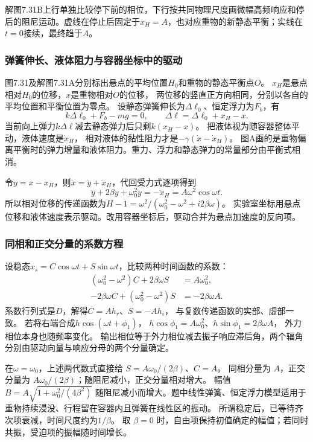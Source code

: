 \documentclass[UTF8,fontset=fandol,a4paper,11pt]{ctexart}
\begin{document}
解图7.31B上行单独比较停下前的相位，下行按共同物理尺度画微幅高频响应和停后的阻尼运动。虚线在停止后固定于$x_H=A$，也对应重物的新静态平衡；实线在$t=0$接续，最终趋于$A$。
\subsubsection*{弹簧伸长、液体阻力与容器坐标中的驱动}
图7.31及解图7.31A分别标出悬点的平均位置$H_0$和重物的静态平衡点$O$。
$x_H$是悬点相对$H_0$的位移，$x$是重物相对$O$的位移，
两位移的竖直正方向相同，分别以各自的平均位置和平衡位置为零点。
设静态弹簧伸长为$\Delta\ell_0$、恒定浮力为$F_b$，有
\[
k\Delta\ell_0+F_b-mg=0,\qquad
\Delta\ell=\Delta\ell_0+x_H-x.
\]
当前向上弹力$k\Delta\ell$减去静态弹力后只剩$k(x_H-x)$。
把液体视为随容器整体平动，液体速度是$\dot x_H$，
相对液体的黏性阻力才是$-\gamma(\dot x-\dot x_H)$。
图A画的是重物偏离平衡时的弹力增量和液体阻力。重力、浮力和静态弹力的常量部分由平衡式相消。

令$y=x-x_H$，则$\ddot x=\ddot y+\ddot x_H$，代回受力式逐项得到
\[
\ddot y+2\beta\dot y+\omega_0^2y=-\ddot x_H
=A\omega^2\cos\omega t.
\]
所以相对位移的传递函数为$H-1=\omega^2/(\omega_0^2-\omega^2+i2\beta\omega)$。
实验室坐标用悬点位移和液体速度表示驱动。改用容器坐标后，驱动合并为悬点加速度的反向项。

\subsubsection*{同相和正交分量的系数方程}
设稳态$x_s=C\cos\omega t+S\sin\omega t$，比较两种时间函数的系数：
\[
\begin{aligned}
(\omega_0^2-\omega^2)C+2\beta\omega S&=A\omega_0^2,\\
-2\beta\omega C+(\omega_0^2-\omega^2)S&=-2\beta\omega A.
\end{aligned}
\]
系数行列式是$D$，解得$C=Ah_r$、$S=-Ah_i$，
与复数传递函数的实部、虚部一致。
若将右端合成$h\cos(\omega t+\phi_1)$，
$h\cos\phi_1=A\omega_0^2$、$h\sin\phi_1=2\beta\omega A$，
外力相位本身也随频率变化。
输出相位等于外力相位减去振子响应滞后角，两个辐角分别由驱动向量与响应分母的两个分量确定。

在$\omega=\omega_0$，上述两代数式直接给
$S=A\omega_0/(2\beta)$、$C=A$。
同相分量为 $A$，正交分量为 $A\omega_0/(2\beta)$；随阻尼减小，正交分量相对增大。
幅值 $B=A\sqrt{1+\omega_0^2/(4\beta^2)}$ 随阻尼减小而增大。题中线性弹簧、恒定浮力模型适用于重物持续浸没、行程留在容器内且弹簧在线性区的振动。
所谓稳定后，已等待齐次项衰减，时间尺度约为$1/\beta$。
取 $\beta=0$ 时，自由项保持初值确定的幅值；若同时共振，受迫项的振幅随时间增长。
\end{document}
